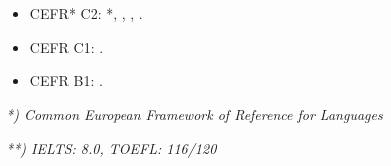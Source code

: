 \section*{\languages}


\begin{itemize}
\item CEFR* C2: \english  **, \danish, \norwegian, \german.
\item CEFR C1: \spanish.
\item CEFR B1: \portuguese.
\end{itemize}

\textit{*) Common European Framework of Reference for Languages}

\textit{**) IELTS: 8.0, TOEFL: 116/120}
